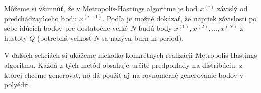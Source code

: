 Môžeme si všimnúť, že v Metropolis-Hastings algoritme je bod $x^{(i)}$ závislý od predchádzajúceho bodu $x^{(i-1)}$. Podľa \cite{metropolis-hastings_chib} je možné dokázať, že napriek závislosti po sebe idúcich bodov pre dostatočne veľké $N$ budú body ${x^{(1)},x^{(2)},\dots,x^{(N)}}$ z hustoty $Q$ (potrebná veľkosť $N$ sa nazýva burn-in period).

V ďalších sekciách si ukážeme niekoľko konkrétnych realizácii Metropolis-Hastings algoritmu. Každá z tých metód obsahuje určité predpoklady na distribúciu, z ktorej chceme generovať, no dá použiť aj na rovnomerné generovanie bodov v polyédri.